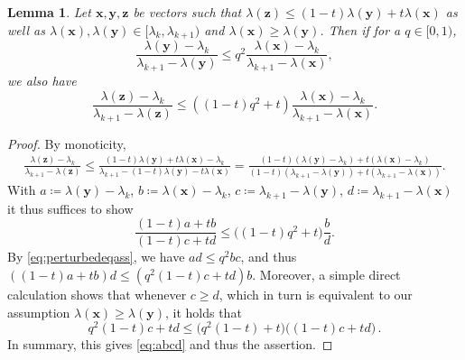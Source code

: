 \documentclass[a4paper,11pt,oneside]{amsart}
\newtheorem{lemma}[theorem]{Lemma}
\theoremstyle{definition}
\theoremstyle{remark}
\newcommand{\ten}[1]{\boldsymbol{#1}}
\numberwithin{equation}{section}
\numberwithin{theorem}{section}
\begin{document}
\begin{appendix}
\begin{lemma}\label{perturbedq}
 Let $\ten x,\ten y,\ten z$ be vectors such that $\lambda(\ten z) \leq (1-t) \lambda(\ten y) + t \lambda(\ten x)$ as well as $\lambda(\ten x), \lambda(\ten y)\in [\lambda_k , \lambda_{k+1})$ and $\lambda(\ten x) \geq \lambda(\ten y)$.
 Then if for a $q \in [0,1)$,
 \begin{equation}\label{eq:perturbedeqass}
  \frac{\lambda(\ten y) - \lambda_k}{\lambda_{k+1} - \lambda(\ten y)} \leq q^2  \frac{\lambda(\ten x) - \lambda_k}{\lambda_{k+1} - \lambda(\ten x)} , 
  \end{equation}
  we also have
  \begin{equation*}
   \frac{\lambda(\ten z) - \lambda_k}{\lambda_{k+1} - \lambda(\ten z)} \leq ((1-t)q^2+t)  \frac{\lambda(\ten x) - \lambda_k}{\lambda_{k+1} - \lambda(\ten x)}.
 \end{equation*}
\end{lemma}
\begin{proof}
 By monoticity, 
 \begin{align*}
  \frac{\lambda(\ten z) - \lambda_k}{\lambda_{k+1} - \lambda(\ten z)} \leq \frac{(1-t) \lambda(\ten y) + t \lambda(\ten x) - \lambda_k}{\lambda_{k+1} - (1-t) \lambda(\ten y) -t  \lambda(\ten x)}
  = \frac{(1-t) (\lambda(\ten y) - \lambda_k) + t(\lambda(\ten x) - \lambda_k)}{(1-t)(\lambda_{k+1} - \lambda(\ten y)) + t( \lambda_{k+1} - \lambda(\ten x))}.
 \end{align*}
With $a \coloneqq  \lambda(\ten y) - \lambda_k$, $b \coloneqq \lambda(\ten x) - \lambda_k$, $c \coloneqq \lambda_{k+1} - \lambda(\ten y)$, $d\coloneqq\lambda_{k+1} - \lambda(\ten x)$ it thus suffices to show
\begin{equation}\label{eq:abcd}
   \frac{(1-t) a + t b}{(1-t) c + t d} \leq \bigl((1-t) q^2  + t\bigr)  \frac{b}{d}.
\end{equation}
By \eqref{eq:perturbedeqass}, we have $ad \leq q^2 bc$, and thus $((1-t) a + t b) d \leq (q^2 (1-t) c + t d) b$. Moreover, a simple direct calculation shows that whenever $c\geq d$, which in turn is equivalent to our assumption $\lambda(\ten x) \geq \lambda(\ten y)$, it holds that
\[
     q^2 (1-t) c + t d   \leq \bigl(q^2 (1 -t) + t \bigr) \bigl( (1 - t) c + t d \bigr)\,.
\]
 In summary, this gives \eqref{eq:abcd} and thus the assertion.
\end{proof}



\end{appendix}
\end{document}
